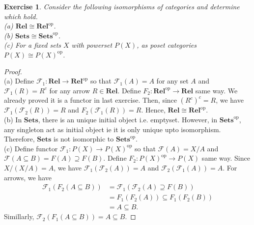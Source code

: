 \documentclass[a4paper, 11pt]{book}
\theoremstyle{plain}
\newtheorem{exercise}{Exercise}[chapter]
\theoremstyle{plain}
\newcommand{\mb}{\mathbf}
\newcommand{\arr}{\rightarrow}
\newcommand{\op}{\text{op}}
\newcommand{\mc}{\mathcal}
\newcommand{\F}{\mc{F}}
\newcommand{\iso}{\cong}
\begin{document}
  \begin{exercise}
    Consider the following isomorphisms of categories and determine which hold. \\
    (a) $\mb{Rel} \iso \mb{Rel}^\op$. \\
    (b) $\mb{Sets} \iso \mb{Sets}^\op$. \\
    (c) For a fixed sets $X$ with powerset $P(X)$, as poset categories $P(X) \iso P(X)^\op$.
  \end{exercise}
  \begin{proof} $ $ \\
    (a) Define $\F_1:\mb{Rel} \arr \mb{Rel}^\op$ so that $\F_1(A)=A$ for any set $A$ and $\F_1(R)=R^c$ for any arrow $R \in \mb{Rel}$. Define $F_2: \mb{Rel}^\op \arr \mb{Rel}$ same way. We already proved it is a functor in last exercise. Then, since $(R^c)^c=R$, we have $\F_1(\F_2(R))=R$ and $F_2(\F_1(R))=R$. Hence, $\mb{Rel} \iso \mb{Rel}^\op$. \\
    
    (b) In $\mb{Sets}$, there is an unique initial object i.e. emptyset. However, in $\mb{Sets}^\op$, any singleton act as initial object ie it is only unique upto isomorphism. Therefore, $\mb{Sets}$ is not isomorphic to $\mb{Sets}^\op$. \\

    (c) Define functor $\F_1: P(X) \arr P(X)^\op$ so that $\mc{F}(A)=X/A$ and $\F(A \subseteq B)=F(A) \supseteq F(B)$. Define $F_2: P(X)^\op \arr P(X)$ same way. Since $X/(X/A)=A$, we have $\F_1(\F_2 (A))=A$ and $\F_2(\F_1(A))=A$. For arrows, we have 
    \begin{align*}
      \F_1 (F_2 (A \subseteq B)) &=\F_1(\F_2(A) \supseteq F(B)) \\ 
      &=F_1(F_2(A)) \subseteq F_1(F_2(B)) \\
      &=A\subseteq B.
    \end{align*}
    Simillarly, $\F_2(F_1(A \subseteq B))=A \subseteq B$. 


    
  \end{proof}
\end{document}
